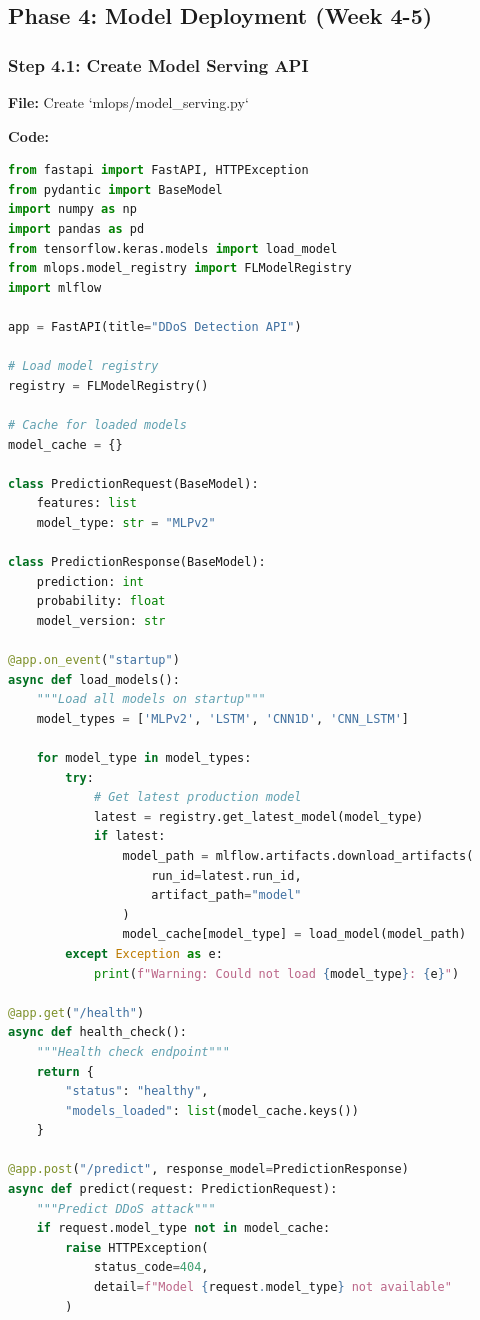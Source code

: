 \documentclass[12pt]{article}
\begin{document}
\subsection{Phase 4: Model Deployment (Week 4-5)}

\subsubsection{Step 4.1: Create Model Serving API}

\textbf{File:} Create `mlops/model_serving.py`

\textbf{Code:}
\begin{lstlisting}[language=Python]
from fastapi import FastAPI, HTTPException
from pydantic import BaseModel
import numpy as np
import pandas as pd
from tensorflow.keras.models import load_model
from mlops.model_registry import FLModelRegistry
import mlflow

app = FastAPI(title="DDoS Detection API")

# Load model registry
registry = FLModelRegistry()

# Cache for loaded models
model_cache = {}

class PredictionRequest(BaseModel):
    features: list
    model_type: str = "MLPv2"

class PredictionResponse(BaseModel):
    prediction: int
    probability: float
    model_version: str

@app.on_event("startup")
async def load_models():
    """Load all models on startup"""
    model_types = ['MLPv2', 'LSTM', 'CNN1D', 'CNN_LSTM']
    
    for model_type in model_types:
        try:
            # Get latest production model
            latest = registry.get_latest_model(model_type)
            if latest:
                model_path = mlflow.artifacts.download_artifacts(
                    run_id=latest.run_id,
                    artifact_path="model"
                )
                model_cache[model_type] = load_model(model_path)
        except Exception as e:
            print(f"Warning: Could not load {model_type}: {e}")

@app.get("/health")
async def health_check():
    """Health check endpoint"""
    return {
        "status": "healthy",
        "models_loaded": list(model_cache.keys())
    }

@app.post("/predict", response_model=PredictionResponse)
async def predict(request: PredictionRequest):
    """Predict DDoS attack"""
    if request.model_type not in model_cache:
        raise HTTPException(
            status_code=404,
            detail=f"Model {request.model_type} not available"
        )
    

\end{lstlisting}
\end{document}
